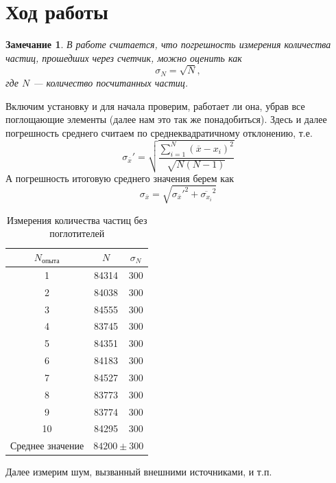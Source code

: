 \documentclass[a4paper, 12pt]{article}%
\newtheorem{zam}{Замечание}
\begin{document}
\section*{Ход работы}
\begin{zam}
В работе считается, что погрешность измерения количества частиц, прошедших через счетчик, можно оценить как
\[\sigma_N = \sqrt{N},\]
где $N$ --- количество посчитанных частиц.
\end{zam}
Включим установку и для начала проверим, работает ли она, убрав все поглощающие элементы (далее нам это так же понадобиться).
Здесь и далее погрешность среднего считаем по среднеквадратичному отклонению, т.е.
\[\sigma_{\overline{x}}' = \sqrt{\frac{\sum\limits_{i = 1}^N\left(\overline{x} - x_i\right)^2}{\sqrt{N(N-1)}}}\]
А погрешность итоговую среднего значения берем как 
\[\sigma_{\overline{x}} = \sqrt{\sigma_{\overline{x}}'^2+\overline{\sigma_{x_i}}^2}\]
\begin{table}[h]
\begin{center}
\begin{tabular}{|c|c|c|}
\hline
$N_{\text{опыта}}$ & $N$           & $\sigma_N$         \\ \hline
1                  & 84314         & 300                \\ \hline
2                  & 84038         & 300                \\ \hline
3                  & 84555         & 300                \\ \hline
4                  & 83745         & 300                \\ \hline
5                  & 84351         & 300                \\ \hline
6                  & 84183         & 300                \\ \hline
7                  & 84527         & 300                \\ \hline
8                  & 83773         & 300                \\ \hline
9                  & 83774         & 300                \\ \hline
10                 & 84295         & 300                \\ \hline
Среднее значение   & \multicolumn{2}{c|}{$84200\pm300$} \\ \hline
\end{tabular}
\caption{Измерения количества частиц без поглотителей}
\end{center}
\end{table}
\newpage
Далее измерим шум, вызванный внешними источниками, и т.п.
\end{document}
